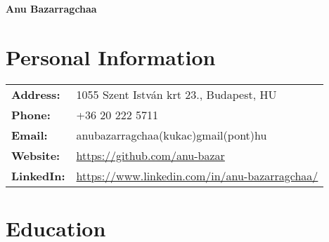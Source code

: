 \documentclass[11pt,a4paper]{article}
\begin{document}
\begin{center}
    \huge\textbf{Anu Bazarragchaa}
\end{center}

\section*{Personal Information}

\begin{tabular}{l l}
    \textbf{Address:} & 1055 Szent István krt 23., Budapest, HU \\
    \textbf{Phone:} & +36 20 222 5711 \\
    \textbf{Email:} & anubazarragchaa(kukac)gmail(pont)hu \\
    \textbf{Website:} & \url{https://github.com/anu-bazar} \\
    \textbf{LinkedIn:} & \url{https://www.linkedin.com/in/anu-bazarragchaa/} \\
\end{tabular}

\section*{Education}
\end{document}
